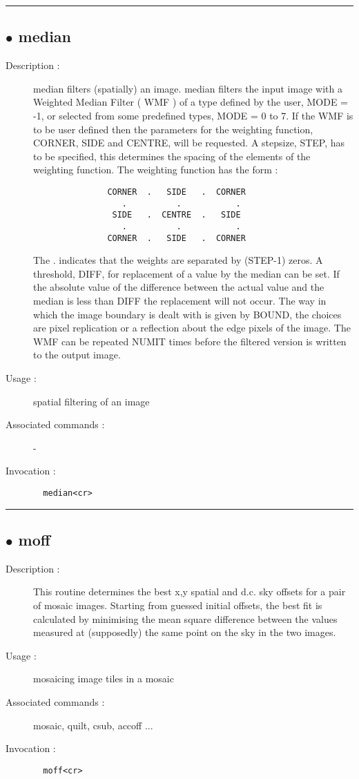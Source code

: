 \hrule \subsection*{$\bullet$ median}
\begin{description}
\item[Description :] median filters (spatially) an image.  median filters the input
image with a Weighted Median Filter ( WMF ) of a type defined by the
user, MODE = -1, or selected from some predefined types, MODE = 0 to 7.
If the WMF is to be user defined then the parameters for the weighting
function, CORNER, SIDE and CENTRE, will be requested. A stepsize,
STEP, has to be specified, this determines the spacing of the elements
of the weighting function. The weighting function has the form :

\begin{verbatim}
               CORNER  .   SIDE   .  CORNER
                  .          .           .
                SIDE   .  CENTRE  .   SIDE
                  .          .           .
               CORNER  .   SIDE   .  CORNER
\end{verbatim}

The . indicates that the weights are separated by (STEP-1) zeros. A
threshold, DIFF, for replacement of a value by the median can be set. If
the absolute value of the difference between the actual value and the
median is less than DIFF the replacement will not occur. The way in which
the image boundary is dealt with is given by BOUND, the choices are pixel
replication or a reflection about the edge pixels of the image. The WMF
can be repeated NUMIT times before the filtered version is written to the
output image.
\item[Usage :] spatial filtering of an image
\item[Associated commands :] -
\item[Invocation :]

\verb+  median<cr> +\end{description}

\hrule \subsection*{$\bullet$ moff}
\begin{description}
\item[Description :] This routine determines the best x,y spatial and d.c. sky offsets
for a pair of mosaic images.  Starting from guessed initial offsets, the
best fit is calculated by minimising the mean square difference between
the values measured at (supposedly) the same point on the sky in the two
images.
\item[Usage :] mosaicing image tiles in a mosaic 
\item[Associated commands :] mosaic, quilt, csub, accoff ...
\item[Invocation :]

\verb+  moff<cr> +\end{description}

